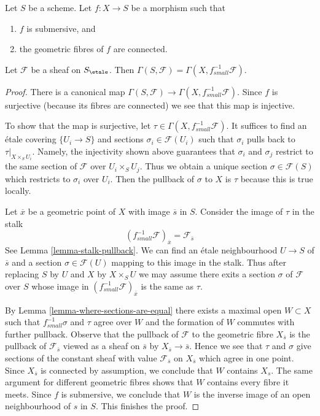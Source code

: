 \begin{lemma}
\label{lemma-sections-upstairs-submersive}
Let $S$ be a scheme. Let $f : X \to S$ be a morphism such that
\begin{enumerate}
\item $f$ is submersive, and
\item the geometric fibres of $f$ are connected.
\end{enumerate}
Let $\mathcal{F}$ be a sheaf on $S_\etale$.
Then $\Gamma(S, \mathcal{F}) = \Gamma(X, f^{-1}_{small}\mathcal{F})$.
\end{lemma}

\begin{proof}
There is a canonical map
$\Gamma(S, \mathcal{F}) \to \Gamma(X, f_{small}^{-1}\mathcal{F})$.
Since $f$ is surjective (because its fibres are connected) we see that
this map is injective.

\medskip\noindent
To show that the map is surjective, let
$\tau \in \Gamma(X, f_{small}^{-1}\mathcal{F})$.
It suffices to find
an \'etale covering $\{U_i \to S\}$ and
sections $\sigma_i \in \mathcal{F}(U_i)$
such that $\sigma_i$ pulls back to $\tau|_{X \times_S U_i}$.
Namely, the injectivity shown above guarantees
that $\sigma_i$ and $\sigma_j$ restrict to the same
section of $\mathcal{F}$ over $U_i \times_S U_j$.
Thus we obtain a unique section $\sigma \in \mathcal{F}(S)$
which restricts to $\sigma_i$ over $U_i$.
Then the pullback of $\sigma$ to $X$ is $\tau$
because this is true locally.

\medskip\noindent
Let $\overline{x}$ be a geometric point of $X$ with image $\overline{s}$
in $S$. Consider the image of $\tau$ in the stalk
$$
(f_{small}^{-1}\mathcal{F})_{\overline{x}} = \mathcal{F}_{\overline{s}}
$$
See Lemma \ref{lemma-stalk-pullback}.
We can find an \'etale neighbourhood $U \to S$ of $\overline{s}$
and a section $\sigma \in \mathcal{F}(U)$ mapping to this image
in the stalk. Thus after replacing $S$ by $U$ and $X$ by $X \times_S U$
we may assume there exits a section $\sigma$ of $\mathcal{F}$ over $S$
whose image in $(f_{small}^{-1}\mathcal{F})_{\overline{x}}$ is the
same as $\tau$.

\medskip\noindent
By Lemma \ref{lemma-where-sections-are-equal}
there exists a maximal open $W \subset X$ such that
$f_{small}^{-1}\sigma$ and $\tau$ agree over $W$
and the formation of $W$ commutes with further pullback.
Observe that the pullback of $\mathcal{F}$ to the
geometric fibre $X_{\overline{s}}$ is the pullback
of $\mathcal{F}_{\overline{s}}$ viewed as a sheaf on
$\overline{s}$ by $X_{\overline{s}} \to \overline{s}$.
Hence we see that $\tau$ and $\sigma$ give sections
of the constant sheaf with value $\mathcal{F}_{\overline{s}}$
on $X_{\overline{s}}$ which agree in one point. Since
$X_{\overline{s}}$ is connected by assumption, we conclude
that $W$ contains $X_s$. The same argument for different
geometric fibres shows that $W$ contains every fibre it meets.
Since $f$ is submersive, we conclude that $W$ is the inverse
image of an open neighbourhood of $s$ in $S$.
This finishes the proof.
\end{proof}